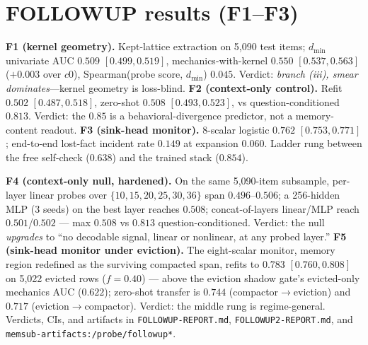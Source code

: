\documentclass[11pt]{article}
\newcommand{\lostfact}{lost-fact incident rate}
\begin{document}
\section{FOLLOWUP results (F1--F3)}
\label{app:followup}
\textbf{F1 (kernel geometry).} Kept-lattice extraction on 5{,}090 test items;
$d_{\min}$ univariate AUC $0.509$ $[0.499, 0.519]$, mechanics-with-kernel
$0.550$ $[0.537, 0.563]$ ($+0.003$ over $c0$), Spearman(probe score,
$d_{\min}$) $0.045$. Verdict: \emph{branch (iii), smear dominates}---kernel
geometry is loss-blind. \textbf{F2 (context-only control).} Refit $0.502$
$[0.487, 0.518]$, zero-shot $0.508$ $[0.493, 0.523]$, vs question-conditioned
$0.813$. Verdict: the $0.85$ is a behavioral-divergence predictor, not a
memory-content readout. \textbf{F3 (sink-head monitor).} 8-scalar logistic
$0.762$ $[0.753, 0.771]$; end-to-end \lostfact{} $0.149$ at expansion
$0.060$. Ladder rung between the free self-check ($0.638$) and the trained
stack ($0.854$).

\medskip
\noindent\textbf{F4 (context-only null, hardened).} On the same 5{,}090-item
subsample, per-layer linear probes over $\{10,15,20,25,30,36\}$ span
$0.496$--$0.506$; a 256-hidden MLP (3 seeds) on the best layer reaches
$0.508$; concat-of-layers linear/MLP reach $0.501$/$0.502$ --- max $0.508$
vs $0.813$ question-conditioned. Verdict: the null \emph{upgrades} to ``no
decodable signal, linear or nonlinear, at any probed layer.''
\textbf{F5 (sink-head monitor under eviction).} The eight-scalar monitor,
memory region redefined as the surviving compacted span, refits to $0.783$
$[0.760, 0.808]$ on 5{,}022 evicted rows ($f{=}0.40$) --- above the eviction
shadow gate's evicted-only mechanics AUC ($0.622$); zero-shot transfer is
$0.744$ (compactor$\rightarrow$eviction) and $0.717$
(eviction$\rightarrow$compactor). Verdict: the middle rung is regime-general.
Verdicts, CIs, and artifacts in \texttt{FOLLOWUP-REPORT.md},
\texttt{FOLLOWUP2-REPORT.md}, and \texttt{memsub-artifacts:/probe/followup*}.
\end{document}
